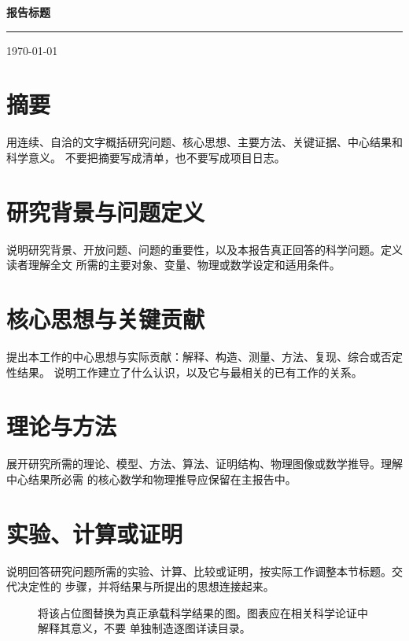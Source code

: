\documentclass[11pt,a4paper,fontset=fandol]{ctexart}
\providecommand{\ReportTitle}{报告标题}
\providecommand{\ReportSubtitle}{}
\providecommand{\ReportAuthor}{}
\providecommand{\ReportOrganization}{}
\providecommand{\ReportClassification}{}
\providecommand{\ReportVersion}{}
\providecommand{\ReportDate}{\today}
\providecommand{\MakeReportCover}{%
  \begin{titlepage}
  \pagecolor{ReportPrimary}\afterpage{\nopagecolor}
  \color{white}
  \vspace*{2.5cm}
  \begin{flushleft}
    {\Huge\bfseries \ReportTitle\par}\vspace{0.6cm}
    \ifdefempty{\ReportSubtitle}{}{{\Large\color{ReportLight}\ReportSubtitle\par}\vspace{1.5cm}}
    {\color{ReportLight}\rule{6cm}{0.6pt}}
  \end{flushleft}
  \vfill
  \begin{flushleft}
    \ifdefempty{\ReportAuthor}{}{{\large \ReportAuthor\par}\vspace{0.2cm}}
    \ifdefempty{\ReportOrganization}{}{{\normalsize\color{ReportLight}\ReportOrganization\par}\vspace{0.6cm}}
    {\normalsize\color{ReportLight}\ReportDate\par}\vspace{0.4cm}
    \ifdefempty{\ReportClassification}{}{{\small\color{ReportLight}机密等级：\ReportClassification\par}}
    \ifdefempty{\ReportVersion}{}{{\small\color{ReportLight}\ReportVersion\par}}
  \end{flushleft}
  \end{titlepage}}
\begin{document}
\hypersetup{pageanchor=false}
\MakeReportCover
\hypersetup{pageanchor=true}
\setcounter{page}{1}

\thispagestyle{plain}
\tableofcontents
\newpage

\section*{摘要}

用连续、自洽的文字概括研究问题、核心思想、主要方法、关键证据、中心结果和科学意义。
不要把摘要写成清单，也不要写成项目日志。

\newpage

\section{研究背景与问题定义}

说明研究背景、开放问题、问题的重要性，以及本报告真正回答的科学问题。定义读者理解全文
所需的主要对象、变量、物理或数学设定和适用条件。

\section{核心思想与关键贡献}

提出本工作的中心思想与实际贡献：解释、构造、测量、方法、复现、综合或否定性结果。
说明工作建立了什么认识，以及它与最相关的已有工作的关系。

\section{理论与方法}

展开研究所需的理论、模型、方法、算法、证明结构、物理图像或数学推导。理解中心结果所必需
的核心数学和物理推导应保留在主报告中。


\section{实验、计算或证明}

说明回答研究问题所需的实验、计算、比较或证明，按实际工作调整本节标题。交代决定性的
步骤，并将结果与所提出的思想连接起来。

\begin{figure}[htbp]
\centering
\fbox{\rule{0pt}{1.8in}\rule{0.85\textwidth}{0pt}}
\caption{将该占位图替换为真正承载科学结果的图。图表应在相关科学论证中解释其意义，不要
单独制造逐图详读目录。}
\label{fig:report-example-zh}
\end{figure}
\end{document}
